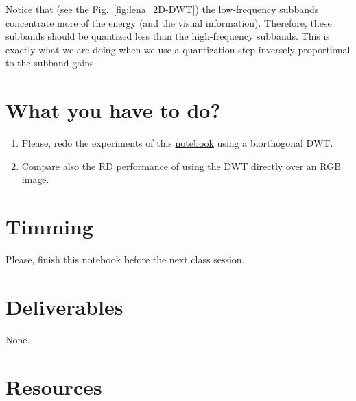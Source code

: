 Notice that (see the Fig.~\ref{fig:lena_2D-DWT}) the low-frequency
subbands concentrate more of the energy (and the visual
information). Therefore, these subbands should be quantized less than
the high-frequency subbands. This is exactly what we are doing when we
use a quantization step inversely proportional to the subband gains.

\section{What you have to do?}

\begin{enumerate}
\item Please, redo the experiments of this
  \href{https://github.com/Sistemas-Multimedia/Sistemas-Multimedia.github.io/blob/master/study_guide/08-2D-DWT/performance.ipynb}{notebook}
  using a biorthogonal DWT.
\item Compare also the RD performance of using the DWT directly over an RGB image.
\end{enumerate}

\section{Timming}

Please, finish this notebook before the next class session.

\section{Deliverables}

None.

\section{Resources}


